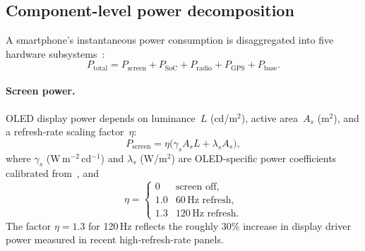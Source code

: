 \documentclass[5p,times,number]{elsarticle}
\begin{document}
\subsection{Component-level power decomposition}\label{sec:power}
A smartphone's instantaneous power consumption is disaggregated into five hardware subsystems~\cite{Carroll2010,Chen2014}:
\begin{equation}\label{eq:ptotal}
P_{\mathrm{total}} = P_{\mathrm{screen}} + P_{\mathrm{SoC}} + P_{\mathrm{radio}} + P_{\mathrm{GPS}} + P_{\mathrm{base}}.
\end{equation}
\paragraph{Screen power.}
OLED display power depends on luminance~$L$ (cd/m$^2$), active area~$A_s$ (m$^2$), and a refresh-rate scaling factor~$\eta$:
\begin{equation}\label{eq:screen}
P_{\mathrm{screen}} = \eta\bigl(\gamma_s A_s L + \lambda_s A_s\bigr),
\end{equation}
where $\gamma_s$ (W\,m$^{-2}$\,cd$^{-1}$) and $\lambda_s$ (W/m$^{2}$) are OLED-specific power coefficients calibrated from~\cite{Lu2008}, and
\begin{equation}
\eta = \begin{cases} 0 & \text{screen off,} \\ 1.0 & 60\,\text{Hz refresh,} \\ 1.3 & 120\,\text{Hz refresh.} \end{cases}
\end{equation}
The factor $\eta = 1.3$ for 120\,Hz reflects the roughly 30\% increase in display driver power measured in recent high-refresh-rate panels.
\end{document}
